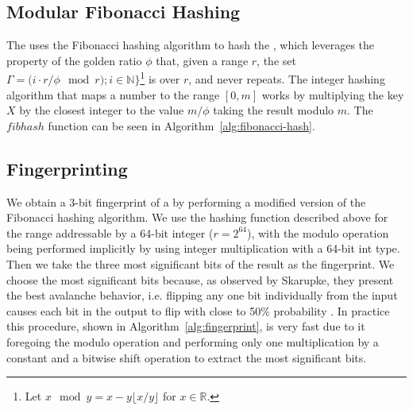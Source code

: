 \subsection{Modular Fibonacci Hashing}\label{sec:fibhash}

The \dBHT uses the Fibonacci hashing algorithm \cite{Skarupke2018} to hash the \kmers, which leverages the property of the golden ratio $\phi$ that, given a range $r$, the set $\Gamma = {(i\cdot r}/{\phi} \mod r) ; i \in \mathbb{N}\}$\footnote{Let $x \mod y = x - y\lfloor x/y \rfloor$ for $x \in \mathbb{R}$.} is  over $r$, and never repeats. The integer hashing algorithm that maps a number to the range $[0, m]$ works by multiplying the key $X$ by the closest integer to the value $m/\phi$ taking the result modulo $m$. The $\mathit{fibhash}$ function can be seen in Algorithm~\ref{alg:fibonacci-hash}.

\begin{algorithm}
  \caption{$\mathit{fibhash}(X, m)$}\label{alg:fibonacci-hash}
\end{algorithm}

\subsection{\kmer Fingerprinting}\label{sec:fingerprint}

We obtain a 3-bit fingerprint of a \kmer by performing a modified version of the Fibonacci hashing algorithm. We use the hashing function described above for the range addressable by a 64-bit integer ($r=2^{64}$), with the modulo operation being performed implicitly by using integer multiplication with a 64-bit int type. Then we take the three most significant bits of the result as the fingerprint. We choose the most significant bits because, as observed by Skarupke, they present the best avalanche behavior, i.e. flipping any one bit individually from the input causes each bit in the output to flip with close to 50\% probability \cite{Skarupke2018}. In practice this procedure, shown in Algorithm~\ref{alg:fingerprint}, is very fast due to it foregoing the modulo operation and performing only one multiplication by a constant and a bitwise shift operation to extract the most significant bits. 

